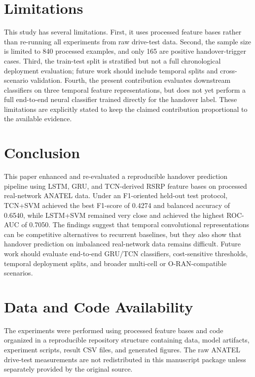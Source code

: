 \documentclass[conference]{IEEEtran}
\begin{document}
\section{Limitations}
This study has several limitations. First, it uses processed feature bases rather than re-running all experiments from raw drive-test data. Second, the sample size is limited to 840 processed examples, and only 165 are positive handover-trigger cases. Third, the train-test split is stratified but not a full chronological deployment evaluation; future work should include temporal splits and cross-scenario validation. Fourth, the present contribution evaluates downstream classifiers on three temporal feature representations, but does not yet perform a full end-to-end neural classifier trained directly for the handover label. These limitations are explicitly stated to keep the claimed contribution proportional to the available evidence.

\section{Conclusion}
This paper enhanced and re-evaluated a reproducible handover prediction pipeline using LSTM, GRU, and TCN-derived RSRP feature bases on processed real-network ANATEL data. Under an F1-oriented held-out test protocol, TCN+SVM achieved the best F1-score of 0.4274 and balanced accuracy of 0.6540, while LSTM+SVM remained very close and achieved the highest ROC-AUC of 0.7050. The findings suggest that temporal convolutional representations can be competitive alternatives to recurrent baselines, but they also show that handover prediction on imbalanced real-network data remains difficult. Future work should evaluate end-to-end GRU/TCN classifiers, cost-sensitive thresholds, temporal deployment splits, and broader multi-cell or O-RAN-compatible scenarios.

\section*{Data and Code Availability}
The experiments were performed using processed feature bases and code organized in a reproducible repository structure containing data, model artifacts, experiment scripts, result CSV files, and generated figures. The raw ANATEL drive-test measurements are not redistributed in this manuscript package unless separately provided by the original source.

\balance
\end{document}
